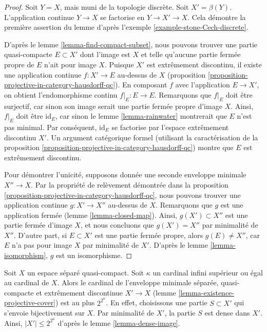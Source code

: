 \begin{proof}
Soit $Y = X$, mais muni de la topologie discrète. Soit $X' = \beta(Y)$.
L'application continue $Y \to X$ se factorise en $Y \to X' \to X$. Cela
démontre la première assertion du lemme d'après
l'exemple \ref{example-stone-Cech-discrete}.

\medskip\noindent
D'après le lemme \ref{lemma-find-compact-subset}, nous pouvons trouver une
partie quasi-compacte $E \subset X'$ dont l'image est $X$ et telle qu'aucune
partie fermée propre de $E$ n'ait pour image $X$.
Puisque $X'$ est extrêmement discontinu, il existe une application continue
$f : X' \to E$ au-dessus de $X$
(proposition \ref{proposition-projective-in-category-hausdorff-qc}).
En composant $f$ avec l'application $E \to X'$, on obtient l'endomorphisme
continu $f|_E : E \to E$. Remarquons que $f|_E$ doit être surjectif, car sinon
son image serait une partie fermée propre d'image $X$.
Ainsi, $f|_E$ doit être $\text{id}_E$, car sinon le
lemme \ref{lemma-rainwater} montrerait que $E$ n'est pas minimal.
Par conséquent, $\text{id}_E$ se factorise par l'espace extrêmement discontinu
$X'$. Un argument catégorique formel (utilisant la caractérisation de la
proposition \ref{proposition-projective-in-category-hausdorff-qc}) montre que
$E$ est extrêmement discontinu.

\medskip\noindent
Pour démontrer l'unicité, supposons donnée une seconde enveloppe minimale
$X'' \to X$. Par la propriété de relèvement démontrée dans la
proposition \ref{proposition-projective-in-category-hausdorff-qc}, nous pouvons
trouver une application continue $g : X' \to X''$ au-dessus de $X$.
Remarquons que $g$ est une application fermée
(lemme \ref{lemma-closed-map}). Ainsi, $g(X') \subset X''$ est une partie
fermée d'image $X$, et nous concluons que
$g(X') = X''$ par minimalité de $X''$. D'autre part, si $E \subset X'$ est une
partie fermée
propre, alors $g(E) \not = X''$, car $E$ n'a pas pour image $X$ par minimalité
de $X'$. D'après le lemme \ref{lemma-isomorphism}, $g$ est un
isomorphisme.
\end{proof}

\begin{remark}
\label{remark-size-projective-cover}
Soit $X$ un espace séparé quasi-compact. Soit $\kappa$ un cardinal infini
supérieur ou égal au cardinal de $X$. Alors le cardinal de l'enveloppe minimale
séparée, quasi-compacte et extrêmement discontinue
$X' \to X$ (lemme \ref{lemma-existence-projective-cover})
est au plus $2^{2^\kappa}$. En effet, choisissons une partie $S \subset X'$
qui s'envoie bijectivement sur $X$. Par minimalité de $X'$, la partie
$S$ est dense dans $X'$. Ainsi, $|X'| \leq 2^{2^\kappa}$ d'après le
lemme \ref{lemma-dense-image}.
\end{remark}






